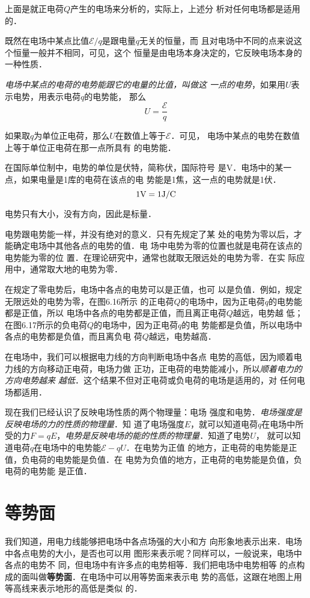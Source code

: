 上面是就正电荷$Q$产生的电场来分析的，实际上，上述分
析对任何电场都是适用的．

既然在电场中某点比值$\mathcal{E}/q$是跟电量$q$无关的恒量，而
且对电场中不同的点来说这个恒量一般并不相同，可见，这个
恒量是由电场本身决定的，它反映电场本身的一种性质．

\textit{电场中某点的电荷的电势能跟它的电量的比值，叫做这
一点的电势}，如果用$U$表示电势，用表示电荷$q$的电势能，
那么
\[U=\frac{\mathcal{E}}{q} \]

如果取$q$为单位正电荷，那么$U$在数值上等于$\mathcal{E}$．可见，
电场中某点的电势在数值上等于单位正电荷在那一点所具有
的电势能．

在国际单位制中，电势的单位是伏特，简称伏，国际符号
是V．电场中的某一点，如果电量是1库的电荷在该点的电
势能是1焦，这一点的电势就是1伏．
\[ 1{\rm V}=1{\rm J}/{\rm C} \]

电势只有大小，没有方向，因此是标量．

电势跟电势能一样，并没有绝对的意义．只有先规定了某
处的电势为零以后，才能确定电场中其他各点的电势的值．电
场中电势为零的位置也就是电荷在该点的电势能为零的位
置．在理论研究中，通常也就取无限远处的电势为零．在实
际应用中，通常取大地的电势为零．

在规定了零电势后，电场中各点的电势可以是正值，也可
以是负值．例如，规定无限远处的电势为零，在图6.16所示
的正电荷$Q$的电场中，因为正电荷$q$的电势能都是正值，所以
电场中各点的电势都是正值，而且离正电荷$Q$越远，电势越
低；在图6.17所示的负电荷$Q$的电场中，因为正电荷$q$的电
势能都是负值，所以电场中各点的电势都是负值，而且离负电
荷$Q$越远，电势越高．

在电场中，我们可以根据电力线的方向判断电场中各点
电势的高低，因为顺着电力线的方向移动正电荷，电场力做
正功，正电荷的电势能减小，所以\textit{顺着电力的方向电势越来
越低}．这个结果不但对正电荷或负电荷的电场是适用的，对
任何电场都适用．

现在我们已经认识了反映电场性质的两个物理量：电场
强度和电势．\textit{电场强度是反映电场的力的性质的物理量}．知
道了电场强度$E$，就可以知道电荷$q$在电场中所受的力$F=
qE$，\textit{电势是反映电场的能的性质的物理量}．知道了电势$U$，
就可以知道电荷$q$在电场中的电势能$\mathcal{E}-qU$．在电势为正值
的地方，正电荷的电势能是正值，负电荷的电势能是负值．在
电势为负值的地方，正电荷的电势能是负值，负电荷的电势能
是正值．

\section{等势面}

我们知道，用电力线能够把电场中各点场强的大小和方
向形象地表示出来．电场中各点电势的大小，是否也可以用
图形来表示呢？同样可以，一般说来，电场中各点的电势不
同，但电场中有许多点的电势相等．我们把电场中电势相等
的点构成的面叫做\textbf{等势面}．在电场中可以用等势面来表示电
势的高低，这跟在地图上用等高线来表示地形的高低是类似
的．


